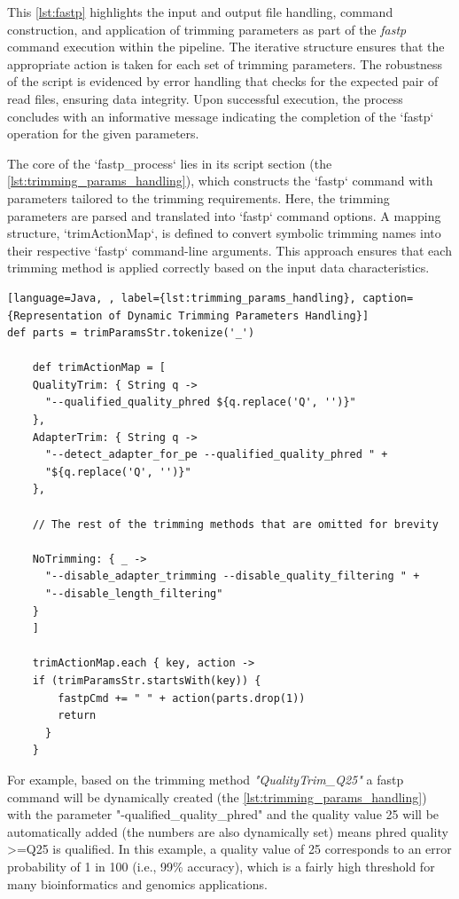 This \autoref{lst:fastp} highlights the input and output file handling, command construction, and application of \gls{trimming} parameters as part of the \textit{fastp} command execution within the pipeline. The iterative structure ensures that the appropriate action is taken for each set of \gls{trimming} parameters. The robustness of the script is evidenced by error handling that checks for the expected pair of \gls{read} files, ensuring data integrity. Upon successful execution, the process concludes with an informative message indicating the completion of the `fastp` operation for the given parameters.

The core of the `fastp\_process` lies in its script section (the \autoref{lst:trimming_params_handling}), which constructs the `fastp` command with parameters tailored to the \gls{trimming} requirements. Here, the \gls{trimming} parameters are parsed and translated into `fastp` command options. A mapping structure, `trimActionMap`, is defined to convert symbolic \gls{trimming} names into their respective `fastp` command-line arguments. This approach ensures that each \gls{trimming} method is applied correctly based on the input data characteristics. 


\begin{lstlisting}[language=Java, , label={lst:trimming_params_handling}, caption={Representation of Dynamic Trimming Parameters Handling}]
def parts = trimParamsStr.tokenize('_')

    def trimActionMap = [
    QualityTrim: { String q -> 
      "--qualified_quality_phred ${q.replace('Q', '')}" 
    },
    AdapterTrim: { String q -> 
      "--detect_adapter_for_pe --qualified_quality_phred " +
      "${q.replace('Q', '')}" 
    },
    
    // The rest of the trimming methods that are omitted for brevity
    
    NoTrimming: { _ -> 
      "--disable_adapter_trimming --disable_quality_filtering " +
      "--disable_length_filtering" 
    }
    ]

    trimActionMap.each { key, action ->
    if (trimParamsStr.startsWith(key)) {
        fastpCmd += " " + action(parts.drop(1))
        return
      }
    }
\end{lstlisting}

For example, based on the \gls{trimming} method \textit{"QualityTrim\_Q25"} a fastp command will be dynamically created (the \autoref{lst:trimming_params_handling}) with the parameter "-qualified\_quality\_phred" and the quality value 25 will be automatically added (the numbers are also dynamically set) means phred quality >=Q25 is qualified. In this example, a quality value of 25 corresponds to an error probability of 1 in 100 (i.e., 99\% accuracy), which is a fairly high threshold for many bioinformatics and genomics applications.


